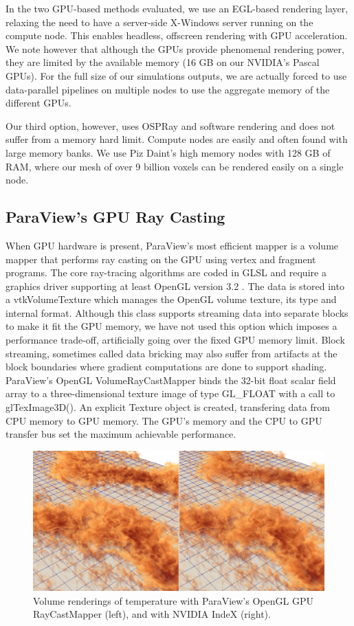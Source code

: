 \documentclass[5p,times]{elsarticle}
\begin{document}
In the two GPU-based methods evaluated, we use an EGL-based rendering layer,
relaxing the need to have a server-side X-Windows server running on the compute node.
This enables headless, offscreen rendering with GPU acceleration. We note however that although
the GPUs provide phenomenal rendering power, they are limited by the available memory
(16 GB on our NVIDIA's Pascal GPUs). For the full size of our simulations outputs,
we are actually forced to use data-parallel pipelines on multiple nodes to use
the aggregate memory of the different GPUs.

Our third option, however, uses OSPRay and software rendering and does not suffer
from a memory hard limit. Compute nodes are easily and often found with large memory
banks. We use Piz Daint's high memory nodes with 128 GB of RAM, where our mesh of
over 9 billion voxels can be rendered easily on a single node.


\subsection{ParaView's GPU Ray Casting} \label{smart}

When GPU hardware is present, ParaView's most efficient mapper is a volume
mapper that performs ray casting on the GPU using vertex and fragment programs.
The core ray-tracing algorithms are coded in GLSL and require a graphics driver
supporting at least OpenGL version 3.2 \cite{ShadersInVTK}. The data is stored
into a vtkVolumeTexture which manages the OpenGL volume texture, its type and
internal format. Although this class supports streaming data into separate blocks
to make it fit the GPU memory, we have not used this option which imposes
a performance trade-off, artificially going over the fixed GPU memory limit.
Block streaming, sometimes called data bricking may also suffer from artifacts at
the block boundaries where gradient computations are done to support shading.
ParaView's OpenGL VolumeRayCastMapper binds the 32-bit float scalar field array
to a three-dimensional texture image of type GL\_FLOAT with a call to glTexImage3D().
An explicit Texture object is created, transfering data from CPU memory to GPU memory.
The GPU's memory and the CPU to GPU transfer bus set the maximum achievable performance.

\begin{figure}
	\centering
	\includegraphics[width=\linewidth]{fig2}%
	\caption{\label{fig:gpucloseup} Volume renderings of temperature with ParaView's
OpenGL GPU RayCastMapper (left), and with NVIDIA IndeX (right).}
\end{figure}
\end{document}
